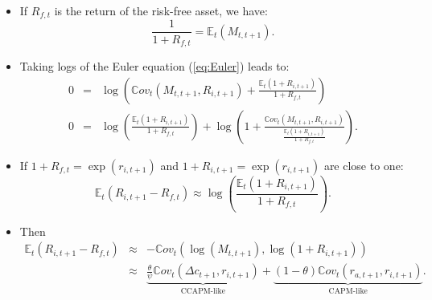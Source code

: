\begin{frame}{}
\begin{footnotesize}
\begin{itemize}
	\item If $R_{f,t}$ is the return of the risk-free asset, we have:
	$$
	\frac{1}{1+R_{f,t}} = \mathbb{E}_t(M_{t,t+1}).
	$$
	\item Taking logs of the Euler equation (\ref{eq:Euler}) leads to:
	\begin{eqnarray*}
	0 &=& \log \left( \mathbb{C}ov_t(M_{t,t+1},R_{i,t+1}) + \frac{\mathbb{E}_t(1+R_{i,t+1})}{1+R_{f,t}} \right)\\
	0 &=& \log \left(  \frac{\mathbb{E}_t(1+R_{i,t+1})}{1+R_{f,t}} \right) + \log \left( 1 + \frac{\mathbb{C}ov_t(M_{t,t+1},R_{i,t+1})}{\frac{\mathbb{E}_t(1+R_{i,t+1})}{1+R_{f,t}}} \right).
	\end{eqnarray*}
	\item If $1+R_{f,t}=\exp(r_{i,t+1})$ and $1+R_{i,t+1}=\exp(r_{i,t+1})$ are close to one:
	$$
	\mathbb{E}_t(R_{i,t+1}-R_{f,t}) \approx\log \left(  \frac{\mathbb{E}_t(1+R_{i,t+1})}{1+R_{f,t}} \right).
	$$
	\item Then
	\begin{eqnarray*}
	\mathbb{E}_t(R_{i,t+1}-R_{f,t}) &\approx& - \mathbb{C}ov_t \left(
	\log(M_{t,t+1}),
	\log(1+R_{i,t+1}) \right)\\
	&\approx& \underbrace{\frac{\theta}{\psi} \mathbb{C}ov_t( \Delta c_{t+1},r_{i,t+1})}_{\mbox{CCAPM-like}} + \underbrace{(1-\theta) \mathbb{C}ov_t( r_{a,t+1},r_{i,t+1})}_{\mbox{CAPM-like}}.
	\end{eqnarray*}
\end{itemize}
\end{footnotesize}
\end{frame}


